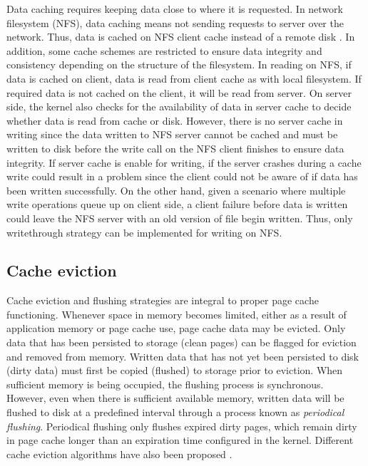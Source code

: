 Data caching requires keeping data close to where it is requested. 
In network filesystem (NFS), data caching means not sending requests 
to server over the network. Thus, data is cached on NFS client cache instead 
of a remote disk \cite{eisler2001managing}. 
In addition, some cache schemes are restricted to ensure data integrity and 
consistency depending on the structure of the filesystem.
In reading on NFS, if data is cached on client, data is read from client cache 
as with local filesystem. If required data is not cached on the client, it will be read 
from server. On server side, the kernel also checks for the availability of data in 
server cache to decide whether data is read from cache or disk. 
However, there is no server cache in writing since the data written to NFS server 
cannot be cached and must be written to disk before the write call on the 
NFS client finishes to ensure data integrity. 
If server cache is enable for writing, if the server crashes during a cache write 
could result in a problem since the client could not be aware of if data has 
been written successfully. 
On the other hand, given a scenario where multiple write operations queue up 
on client side, a client failure before data is written could leave the NFS server 
with an old version of file begin written. 
Thus, only writethrough strategy can be implemented for writing on NFS. 

\subsection{Cache eviction}

Cache eviction and flushing strategies are integral to proper page cache functioning.
Whenever space in memory becomes limited, either as a result of application memory
or page cache use, page cache data may be evicted. Only data that
has been persisted to storage (clean pages) can be flagged for eviction and removed from
memory. Written data that has not yet been persisted to disk (dirty data) must first
be copied (flushed) to storage prior to eviction. When sufficient memory is
being occupied, the flushing process is synchronous. However, even when
there is sufficient available memory, written data will be flushed to disk
at a predefined interval through a process known as \textit{periodical flushing}.
Periodical flushing only flushes expired dirty pages, which remain dirty in
page cache longer than an expiration time configured in the kernel.
Different cache eviction algorithms have also been proposed
\cite{owda2014comparison}.


